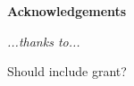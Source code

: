 \thispagestyle{empty}

\begin{center}
  {\bf \Huge Acknowledgements}
\end{center}

\vspace{4cm}


\emph{
  ...thanks to...
}

Should include grant?